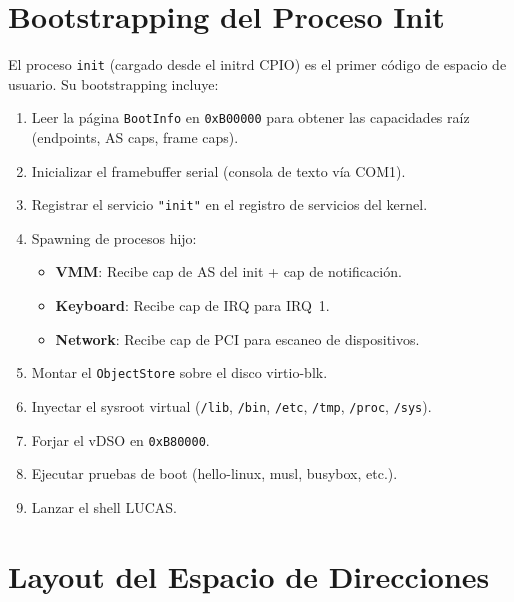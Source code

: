 \documentclass[11pt,twoside,openright]{book}
\theoremstyle{definition}
\theoremstyle{plain}
\theoremstyle{remark}
\begin{document}
\section{Bootstrapping del Proceso Init}
\label{sec:init-bootstrap}

El proceso \texttt{init} (cargado desde el initrd CPIO) es el primer código
de espacio de usuario. Su bootstrapping incluye:

\begin{enumerate}
    \item Leer la página \texttt{BootInfo} en \texttt{0xB00000} para obtener
          las capacidades raíz (endpoints, AS caps, frame caps).
    \item Inicializar el framebuffer serial (consola de texto vía COM1).
    \item Registrar el servicio \texttt{"init"} en el registro de servicios del kernel.
    \item Spawning de procesos hijo:
          \begin{itemize}
              \item \textbf{VMM}: Recibe cap de AS del init + cap de notificación.
              \item \textbf{Keyboard}: Recibe cap de IRQ para IRQ~1.
              \item \textbf{Network}: Recibe cap de PCI para escaneo de dispositivos.
          \end{itemize}
    \item Montar el \texttt{ObjectStore} sobre el disco virtio-blk.
    \item Inyectar el sysroot virtual (\texttt{/lib}, \texttt{/bin}, \texttt{/etc},
          \texttt{/tmp}, \texttt{/proc}, \texttt{/sys}).
    \item Forjar el vDSO en \texttt{0xB80000}.
    \item Ejecutar pruebas de boot (hello-linux, musl, busybox, etc.).
    \item Lanzar el shell LUCAS.
\end{enumerate}

\section{Layout del Espacio de Direcciones}
\label{sec:addr-layout}
\end{document}

